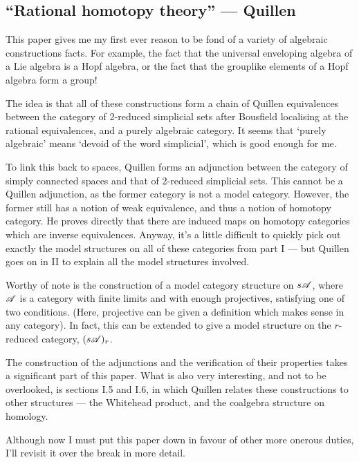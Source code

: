 \documentclass[11pt]{article}
\newcommand{\KanSemResponse}[1]
{
\thispagestyle{fancy}
\section{#1}
}
\begin{document}
\begin{RationalHomotopyQuillen}
\KanSemResponse
{``Rational homotopy theory'' --- Quillen}
This paper gives me my first ever reason to be fond of a variety of algebraic constructions facts. For example, the fact that the universal enveloping algebra of a Lie algebra is a Hopf algebra, or the fact that the grouplike elements of a Hopf algebra form a group!

The idea is that all of these constructions form a chain of Quillen equivalences between the category of 2-reduced simplicial sets after Bousfield localising at the rational equivalences, and a purely algebraic category. It seems that `purely algebraic' means `devoid of the word simplicial', which is good enough for me.

To link this back to spaces, Quillen forms an adjunction between the category of simply connected spaces and that of 2-reduced simplicial sets. This cannot be a Quillen adjunction, as the former category is not a model category. However, the former still has a notion of weak equivalence, and thus a notion of homotopy category. He proves directly that there are induced maps on homotopy categories which are inverse equivalences. Anyway, it's a little difficult to quickly pick out exactly the model structures on all of these categories from part I --- but Quillen goes on in II to explain all the model structures involved.

Worthy of note is the construction of a model category structure on $s\mathscr{A}$, where $\mathscr{A}$ is a category with finite limits and with enough projectives, satisfying one of two conditions. (Here, projective can be given a definition which makes sense in any category). In fact, this can be extended to give a model structure on the $r$-reduced category, $(s\mathscr{A})_r$.

The construction of the adjunctions and the verification of their properties takes a significant part of this paper. What is also very interesting, and not to be overlooked, is sections I.5 and I.6, in which Quillen relates these constructions to other structures ---  the Whitehead product, and the coalgebra structure on homology.

Although now I must put this paper down in favour of other more onerous duties, I'll revisit it over the break in more detail.



\pagebreak
\end{RationalHomotopyQuillen}
\end{document}

